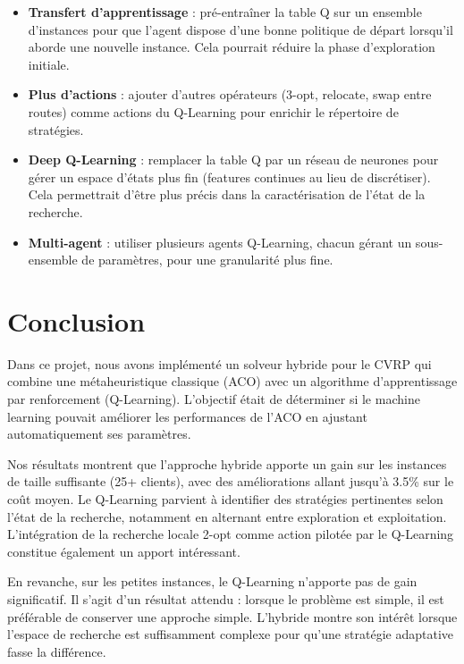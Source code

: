 \documentclass[12pt, a4paper]{article}
\begin{document}
\begin{itemize}
    \item \textbf{Transfert d'apprentissage} : pré-entraîner la table Q sur un ensemble d'instances pour que l'agent dispose d'une bonne politique de départ lorsqu'il aborde une nouvelle instance. Cela pourrait réduire la phase d'exploration initiale.

    \item \textbf{Plus d'actions} : ajouter d'autres opérateurs (3-opt, relocate, swap entre routes) comme actions du Q-Learning pour enrichir le répertoire de stratégies.

    \item \textbf{Deep Q-Learning} : remplacer la table Q par un réseau de neurones pour gérer un espace d'états plus fin (features continues au lieu de discrétiser). Cela permettrait d'être plus précis dans la caractérisation de l'état de la recherche.

    \item \textbf{Multi-agent} : utiliser plusieurs agents Q-Learning, chacun gérant un sous-ensemble de paramètres, pour une granularité plus fine.

\end{itemize}

\section{Conclusion}

Dans ce projet, nous avons implémenté un solveur hybride pour le CVRP qui combine une métaheuristique classique (ACO) avec un algorithme d'apprentissage par renforcement (Q-Learning). L'objectif était de déterminer si le machine learning pouvait améliorer les performances de l'ACO en ajustant automatiquement ses paramètres.

Nos résultats montrent que l'approche hybride apporte un gain sur les instances de taille suffisante (25+ clients), avec des améliorations allant jusqu'à 3.5\% sur le coût moyen. Le Q-Learning parvient à identifier des stratégies pertinentes selon l'état de la recherche, notamment en alternant entre exploration et exploitation. L'intégration de la recherche locale 2-opt comme action pilotée par le Q-Learning constitue également un apport intéressant.

En revanche, sur les petites instances, le Q-Learning n'apporte pas de gain significatif. Il s'agit d'un résultat attendu : lorsque le problème est simple, il est préférable de conserver une approche simple. L'hybride montre son intérêt lorsque l'espace de recherche est suffisamment complexe pour qu'une stratégie adaptative fasse la différence.
\end{document}
